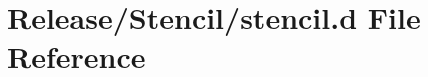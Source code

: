 \hypertarget{_release_2_stencil_2stencil_8d}{\section{Release/\-Stencil/stencil.d File Reference}
\label{dd/de1/_release_2_stencil_2stencil_8d}
}
